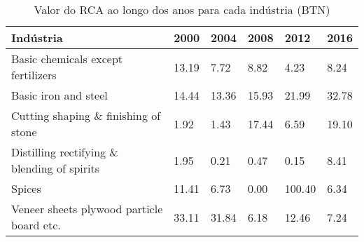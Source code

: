 \begin{table}
\centering
\caption{Valor do RCA ao longo dos anos para cada indústria (BTN)}
\label{tab:ex3-tempo-BTN}
\begin{tabular}{p{6cm}p{1.5cm}p{1.5cm}p{1.5cm}p{1.5cm}p{1.5cm}}
\toprule
                                  Indústria &  2000 &  2004 &  2008 &   2012 &  2016 \\
\midrule
         Basic chemicals except fertilizers & 13.19 &  7.72 &  8.82 &   4.23 &  8.24 \\
                       Basic iron and steel & 14.44 & 13.36 & 15.93 &  21.99 & 32.78 \\
       Cutting shaping \& finishing of stone &  1.92 &  1.43 & 17.44 &   6.59 & 19.10 \\
Distilling rectifying \& blending of spirits &  1.95 &  0.21 &  0.47 &   0.15 &  8.41 \\
                                     Spices & 11.41 &  6.73 &  0.00 & 100.40 &  6.34 \\
  Veneer sheets plywood particle board etc. & 33.11 & 31.84 &  6.18 &  12.46 &  7.24 \\
\bottomrule
\end{tabular}
\end{table}
